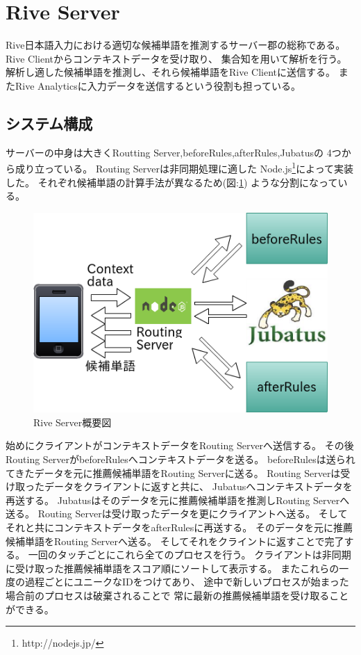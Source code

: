\section{Rive Server}
\label{sec:riveserver}
Rive日本語入力における適切な候補単語を推測するサーバー郡の総称である。
Rive Clientからコンテキストデータを受け取り、
集合知を用いて解析を行う。
解析し適した候補単語を推測し、それら候補単語をRive Clientに送信する。
またRive Analyticsに入力データを送信するという役割も担っている。

\subsection{システム構成}
サーバーの中身は大きくRoutting Server,beforeRules,afterRules,Jubatusの
4つから成り立っている。
Routing Serverは非同期処理に適した
Node.js\footnote{http://nodejs.jp/}によって実装した。
それぞれ候補単語の計算手法が異なるため(図:\ref{fig:riveserver})
ような分割になっている。
\begin{figure}[htbp]
  \begin{center}
    \includegraphics[width=14cm,bb=0 0 466 316]{images/riveserver.png}
  \end{center}
  \caption{Rive Server概要図}
  \label{fig:riveserver}
\end{figure}
始めにクライアントがコンテキストデータをRouting Serverへ送信する。
その後Routing ServerがbeforeRulesへコンテキストデータを送る。
beforeRulesは送られてきたデータを元に推薦候補単語をRouting Serverに送る。
Routing Serverは受け取ったデータをクライアントに返すと共に、
Jubatusへコンテキストデータを再送する。
Jubatusはそのデータを元に推薦候補単語を推測しRouting Serverへ送る。
Routing Serverは受け取ったデータを更にクライアントへ送る。
そしてそれと共にコンテキストデータをafterRulesに再送する。
そのデータを元に推薦候補単語をRouting Serverへ送る。
そしてそれをクライントに返すことで完了する。
一回のタッチごとにこれら全てのプロセスを行う。
クライアントは非同期に受け取った推薦候補単語をスコア順にソートして表示する。
またこれらの一度の過程ごとにユニークなIDをつけてあり、
途中で新しいプロセスが始まった場合前のプロセスは破棄されることで
常に最新の推薦候補単語を受け取ることができる。

